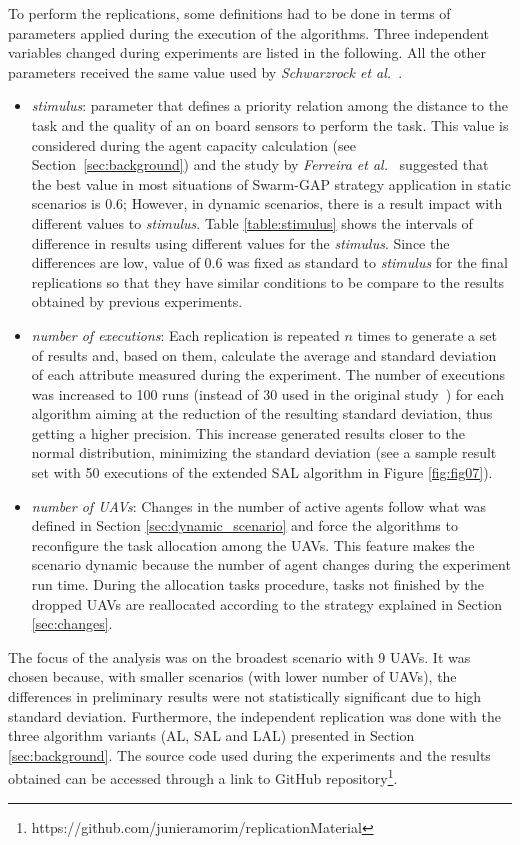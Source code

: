 To perform the replications, some definitions had to be done in terms of parameters applied during the execution of the algorithms. Three independent variables changed during experiments are listed in the following. All the other parameters received the same value used by \textit{Schwarzrock et al.}~\cite{MAS07}.
\begin{itemize}
   \item \textit{stimulus}: parameter that defines a priority relation among the distance to the task and the quality of an on board sensors to perform the task. This value is considered during the agent capacity calculation (see Section~\ref{sec:background}) and the study by \textit{Ferreira et al.}~\cite{ferreira2010robocup} suggested that the best value in most situations of Swarm-GAP strategy application in static scenarios is $0.6$; However, in dynamic scenarios, there is a result impact with different values to \textit{stimulus}. Table \ref{table:stimulus} shows the intervals of difference in results using different values for the \textit{stimulus}. Since the differences are low, value of $0.6$ was fixed as standard to \textit{stimulus} for the final replications so that they have similar conditions to be compare to the results obtained by previous experiments.
   \item \textit{number of executions}: Each replication is repeated $n$ times to generate a set of results and, based on them, calculate the average and standard deviation of each attribute measured during the experiment. The number of executions was increased to 100 runs (instead of 30 used in the original study~\cite{MAS07}) for each algorithm aiming at the reduction of the resulting standard deviation, thus getting a higher precision. This increase generated results closer to the normal distribution, minimizing the standard deviation (see a sample result set with 50 executions of the extended SAL algorithm in Figure \ref{fig:fig07}).
   \item \textit{number of UAVs}: Changes in the number of active agents follow what was defined in Section \ref{sec:dynamic_scenario} and force the algorithms to reconfigure the task allocation among the UAVs. This feature makes the scenario dynamic because the number of agent changes during the experiment run time. During the allocation tasks procedure, tasks not finished by the dropped UAVs are reallocated according to the strategy explained in Section \ref{sec:changes}.
\end{itemize}

The focus of the analysis was on the broadest scenario with 9 UAVs. It was chosen because, with smaller scenarios (with lower number of UAVs), the differences in preliminary results were not statistically significant due to high standard deviation. Furthermore, the independent replication was done with the three algorithm variants (AL, SAL and LAL) presented in Section \ref{sec:background}. The source code used during the experiments and the results obtained can be accessed through a link to GitHub repository\footnote{https://github.com/junieramorim/replicationMaterial}.


